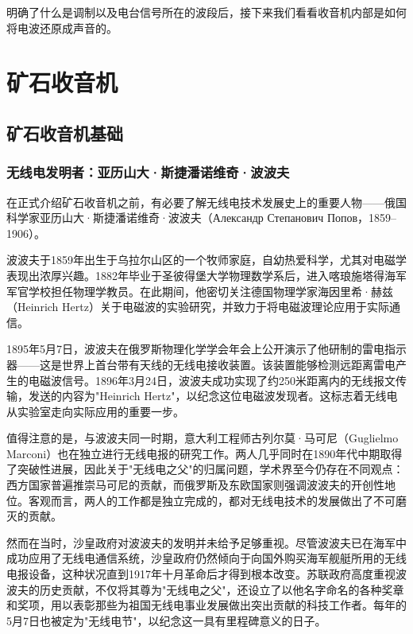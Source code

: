 \documentclass[12pt,UTF8]{ctexbook}
\begin{document}
明确了什么是调制以及电台信号所在的波段后，接下来我们看看收音机内部是如何将电波还原成声音的。

\part{矿石收音机}
\label{part:crystal-radio}

\chapter{矿石收音机基础}
\label{chap:crystal-radio-basics}

\section{无线电发明者：亚历山大·斯捷潘诺维奇·波波夫}

在正式介绍矿石收音机之前，有必要了解无线电技术发展史上的重要人物——俄国科学家亚历山大·斯捷潘诺维奇·波波夫（Александр Степанович Попов，1859–1906）。

波波夫于1859年出生于乌拉尔山区的一个牧师家庭，自幼热爱科学，尤其对电磁学表现出浓厚兴趣。1882年毕业于圣彼得堡大学物理数学系后，进入喀琅施塔得海军军官学校担任物理学教员。在此期间，他密切关注德国物理学家海因里希·赫兹（Heinrich Hertz）关于电磁波的实验研究，并致力于将电磁波理论应用于实际通信。

1895年5月7日，波波夫在俄罗斯物理化学学会年会上公开演示了他研制的雷电指示器——这是世界上首台带有天线的无线电接收装置。该装置能够检测远距离雷电产生的电磁波信号。1896年3月24日，波波夫成功实现了约250米距离内的无线报文传输，发送的内容为"Heinrich Hertz"，以纪念这位电磁波发现者。这标志着无线电从实验室走向实际应用的重要一步。

值得注意的是，与波波夫同一时期，意大利工程师古列尔莫·马可尼（Guglielmo Marconi）也在独立进行无线电报的研究工作。两人几乎同时在1890年代中期取得了突破性进展，因此关于"无线电之父"的归属问题，学术界至今仍存在不同观点：西方国家普遍推崇马可尼的贡献，而俄罗斯及东欧国家则强调波波夫的开创性地位。客观而言，两人的工作都是独立完成的，都对无线电技术的发展做出了不可磨灭的贡献。

然而在当时，沙皇政府对波波夫的发明并未给予足够重视。尽管波波夫已在海军中成功应用了无线电通信系统，沙皇政府仍然倾向于向国外购买海军舰艇所用的无线电报设备，这种状况直到1917年十月革命后才得到根本改变。苏联政府高度重视波波夫的历史贡献，不仅将其尊为"无线电之父"，还设立了以他名字命名的各种奖章和奖项，用以表彰那些为祖国无线电事业发展做出突出贡献的科技工作者。每年的5月7日也被定为"无线电节"，以纪念这一具有里程碑意义的日子。
\end{document}
